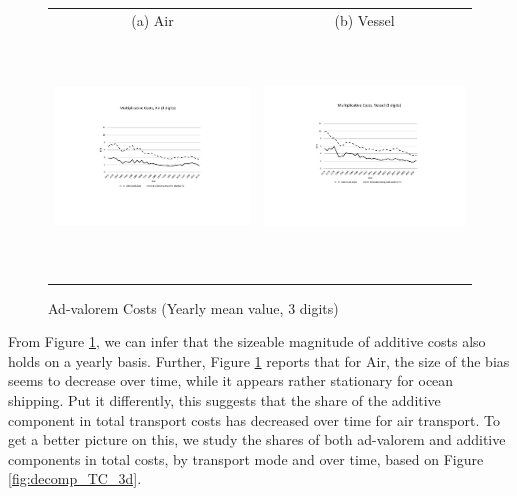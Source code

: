 \documentclass[a4paper,11pt]{article}
\begin{document}
\begin{figure}[htbp]
\caption{Ad-valorem Costs (Yearly mean value, 3 digits)}
\label{fig:mult_alone_withadd}
\begin{center}
\begin{tabular}{cc}
{\small (a) Air } & {\small (b) Vessel}\\
\includegraphics[width=3in, height=2.5in]{Fig1a_mult_air_3d.pdf}
& \includegraphics[width=3in,height=2.5in]{Fig1b_mult_vessel_3d.pdf} \\
\end{tabular}
\end{center}
\end{figure}

From Figure \ref{fig:mult_alone_withadd}, we can infer that the sizeable magnitude of additive costs also holds on a yearly basis. Further, Figure \ref{fig:mult_alone_withadd} reports that for Air, the size of the bias seems to decrease over time, while it appears rather stationary for ocean shipping. Put it differently, this suggests that the share of the additive component in total transport costs has decreased over time for air transport. To get a better picture on this, we study the shares of both ad-valorem and additive components in total costs, by transport mode and over time, based on Figure \ref{fig:decomp_TC_3d}.
\end{document}

